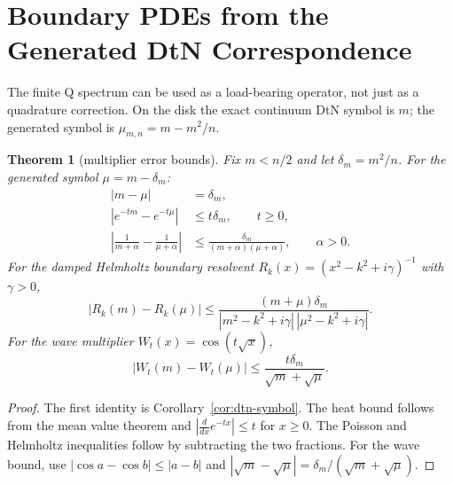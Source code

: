 \documentclass[10pt,leqno]{article}
\numberwithin{equation}{section}
\theoremstyle{plain}
\newtheorem{theorem}{Theorem}[section]
\theoremstyle{definition}
\theoremstyle{remark}
\begin{document}
\section{Boundary PDEs from the Generated DtN Correspondence}
The finite Q spectrum can be used as a load-bearing operator, not just as a quadrature correction.  On the disk the exact continuum DtN symbol is $m$; the generated symbol is $\mu_{m,n}=m-m^2/n$.

\begin{theorem}[multiplier error bounds]\label{thm:pde-bounds}
Fix $m<n/2$ and let $\delta_m=m^2/n$.  For the generated symbol $\mu=m-\delta_m$:
\begin{align}
|m-\mu|&=\delta_m,\\
|e^{-tm}-e^{-t\mu}|&\le t\delta_m,\qquad t\ge0,\\
\left|\frac1{m+\alpha}-\frac1{\mu+\alpha}\right|&\le
\frac{\delta_m}{(m+\alpha)(\mu+\alpha)},\qquad \alpha>0.
\end{align}
For the damped Helmholtz boundary resolvent $R_k(x)=(x^2-k^2+i\gamma)^{-1}$ with $\gamma>0$,
\begin{equation}
|R_k(m)-R_k(\mu)|
\le \frac{(m+\mu)\delta_m}
{|m^2-k^2+i\gamma|\,|\mu^2-k^2+i\gamma|}.
\end{equation}
For the wave multiplier $W_t(x)=\cos(t\sqrt x)$,
\begin{equation}
|W_t(m)-W_t(\mu)|\le \frac{t\delta_m}{\sqrt m+\sqrt\mu}.
\end{equation}
\end{theorem}
\begin{proof}
The first identity is Corollary~\ref{cor:dtn-symbol}.  The heat bound follows from the mean value theorem and $|\frac{d}{dx}e^{-tx}|\le t$ for $x\ge0$.  The Poisson and Helmholtz inequalities follow by subtracting the two fractions.  For the wave bound, use $|\cos a-\cos b|\le |a-b|$ and $|\sqrt m-\sqrt\mu|=\delta_m/(\sqrt m+\sqrt\mu)$.
\end{proof}
\end{document}
